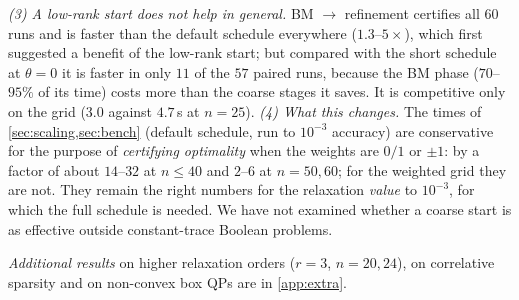 \documentclass[a4paper,11pt]{article}
\theoremstyle{plain}
\theoremstyle{definition}
\theoremstyle{remark}
\begin{document}
\emph{(3) A low-rank start does not help in general.} BM $\to$ refinement certifies all $60$ runs and is faster than the default schedule everywhere ($1.3$--$5\times$), which first suggested a benefit of the low-rank start; but compared with the short schedule at $\theta=0$ it is faster in only $11$ of the $57$ paired runs, because the BM phase ($70$--$95\%$ of its time) costs more than the coarse stages it saves. It is competitive only on the grid ($3.0$ against $4.7$\,s at $n=25$).
\emph{(4) What this changes.} The times of \cref{sec:scaling,sec:bench} (default schedule, run to $10^{-3}$ accuracy) are conservative for the purpose of \emph{certifying optimality} when the weights are $0/1$ or $\pm1$: by a factor of about $14$--$32$ at $n\le40$ and $2$--$6$ at $n=50,60$; for the weighted grid they are not. They remain the right numbers for the relaxation \emph{value} to $10^{-3}$, for which the full schedule is needed. We have not examined whether a coarse start is as effective outside constant-trace Boolean problems.

\emph{Additional results} on higher relaxation orders ($r=3$, $n=20,24$), on correlative sparsity and on non-convex box QPs are in \cref{app:extra}.
\end{document}
